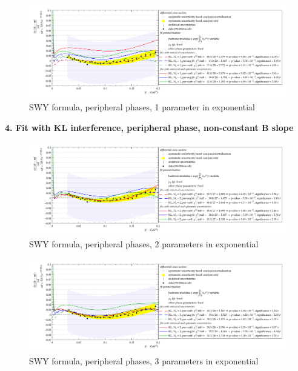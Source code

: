 \begin{figure}
\begin{center}
\includegraphics[width=18cm]{simone/90/KL,per-var048,1,stat-stat+syst.pdf}
\vskip-3mm
\caption{SWY formula, peripheral phases, 1 parameter in exponential}
\label{fig:90,KL,per,1}
\end{center}
\end{figure}

{\bf 4. Fit with KL interference, peripheral phase, non-constant B slope}

\begin{figure}
\begin{center}
\includegraphics[width=18cm]{simone/90/KL,per-var048,2,stat-stat+syst.pdf}
\vskip-3mm
\caption{SWY formula, peripheral phases, 2 parameters in exponential}
\label{fig:90,KL,per,2}
\end{center}
\end{figure}

\begin{figure}
\begin{center}
\includegraphics[width=18cm]{simone/90/KL,per-var048,3,stat-stat+syst.pdf}
\vskip-3mm
\caption{SWY formula, peripheral phases, 3 parameters in exponential}
\label{fig:90,KL,per,3}
\end{center}
\end{figure}


